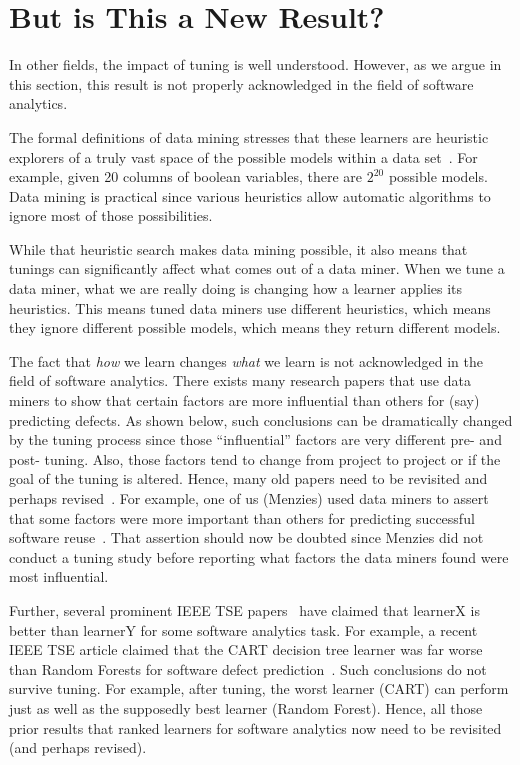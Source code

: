 \documentclass{sig-alternative}
\begin{document}
\section{But is This a New Result?}


In  other fields, the impact of tuning is well understood. However, as we argue
in this section, this result is not properly  acknowledged  in the field of software analytics. 

The formal definitions of data mining stresses that these learners are heuristic explorers
of a truly   vast space of the possible models within a data set~\cite{mitchell1982generalization}. For example, given 20 columns of boolean variables,
there are $2^{20}$ possible models. Data mining is practical since various heuristics
allow automatic algorithms to ignore most of those possibilities. 

While that heuristic search makes data mining possible, it also means that tunings
can significantly affect what comes out of a data miner.
When we tune a data miner, what we are really doing is changing how a learner applies
its heuristics. This means tuned data miners use different heuristics, which means they ignore different possible models, which means they return different models.     

The fact that {\em how} we learn changes {\em what} we learn is not acknowledged
in the field of software analytics.
There exists many research papers
that use data miners to   show that certain factors
are more influential than others for (say)
predicting defects. As shown below, such conclusions can be dramatically
changed by the tuning process since those  ``influential'' factors are very different pre- and post- tuning. Also, those factors tend to  change from project to project or if the goal
of the tuning is altered.
Hence, many old papers    need to be revisited  and perhaps revised~\cite{bell2013limited,rahman2013how,me02k,moser2008comparative,zimmermann2007predicting,herzig2013predicting}.  
For example, one of us (Menzies) used data miners
to assert that some factors were more important than others for predicting
successful software reuse~\cite{me02k}. That assertion should now be doubted since Menzies did not conduct a tuning study before reporting what factors the data miners
found were most influential.

Further, several  prominent IEEE TSE papers~\cite{lessmann2008benchmarking,hall11,me07b} have claimed 
that learnerX is better than learnerY for some software analytics task.
For example, a recent IEEE TSE article claimed that the 
CART decision tree learner was far worse than Random Forests for
software defect prediction~\cite{lessmann2008benchmarking}. 
Such conclusions do not survive tuning.
For example,
after tuning, the worst learner (CART) can perform just as well as the supposedly
best learner (Random Forest). Hence, all those prior results that ranked learners for software
analytics now need to be revisited (and perhaps revised).
\end{document}
